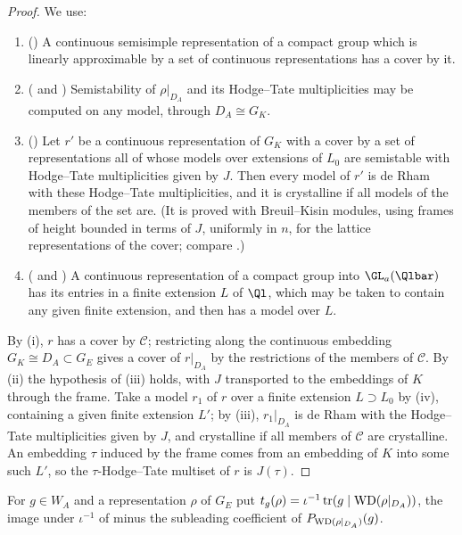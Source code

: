 \begin{proof}
We use:
\begin{enumerate}[label=(\roman*),nosep]
\item () A continuous semisimple representation of a compact group
  which is linearly approximable by a set of continuous representations has a cover by it.
\item ( and ) Semistability of $\rho|_{D_A}$ and its
  Hodge--Tate multiplicities may be computed on any model, through $D_A\cong G_K$.
\item () Let $r'$ be a continuous representation of $G_K$ with a cover by a set
  of representations all of whose models over extensions of $L_0$ are semistable with Hodge--Tate multiplicities given by
  $J$. Then every model of $r'$ is de Rham with these Hodge--Tate multiplicities, and it is crystalline if all models of the
  members of the set are. (It is proved with Breuil--Kisin modules, using frames of height bounded in terms of $J$,
  uniformly in $n$, for the lattice representations of the cover; compare \cite{Berger2004,Kisin2008}.)
\item ( and ) A
  continuous representation of a compact group into $\GL_a(\Qlbar)$ has its entries in a finite extension $L$ of $\Ql$,
  which may be taken to contain any given finite extension, and then has a model over $L$.
\end{enumerate}
By (i), $r$ has a cover by $\mathcal C$; restricting along the continuous embedding $G_K\cong D_A\subset G_E$ gives a cover
of $r|_{D_A}$ by the restrictions of the members of $\mathcal C$. By (ii) the hypothesis of (iii) holds, with $J$ transported
to the embeddings of $K$ through the frame. Take a model $r_1$ of $r$ over a finite extension $L\supset L_0$ by (iv),
containing a given finite extension $L'$; by (iii), $r_1|_{D_A}$ is de Rham with the Hodge--Tate multiplicities given by
$J$, and crystalline if all members of $\mathcal C$ are crystalline. An embedding $\tau$ induced by the frame comes from an
embedding of $K$ into some such $L'$, so the $\tau$-Hodge--Tate multiset of $r$ is $J(\tau)$.
\end{proof}

For $g\in W_A$ and a representation $\rho$ of $G_E$ put $t_g(\rho)=\iota^{-1}\operatorname{tr}(g\mid\mathrm{WD}(\rho|_{D_A}))$, the
image under $\iota^{-1}$ of minus the subleading coefficient of $P_{\mathrm{WD}(\rho|_{D_A})}(g)$.

